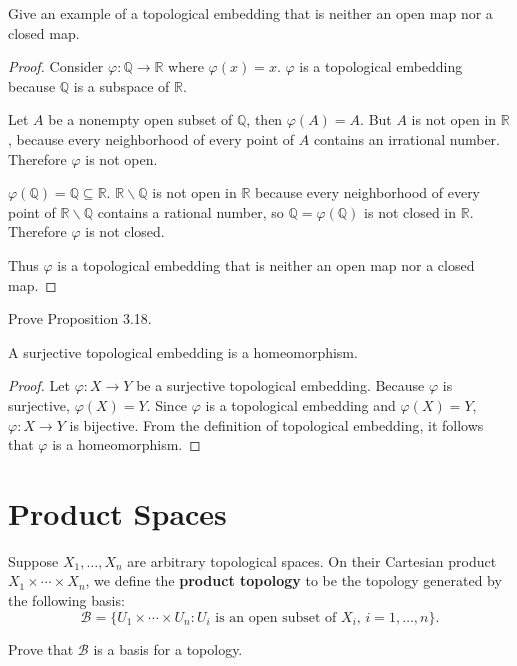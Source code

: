 \begin{exercise}{3.17}
    Give an example of a topological embedding that is neither an open map nor a closed map.
\end{exercise}

\begin{proof}
    Consider $\varphi: \mathbb{Q}\to \mathbb{R}$ where $\varphi(x) = x$. $\varphi$ is a topological embedding because $\mathbb{Q}$ is a subspace of $\mathbb{R}$.

    Let $A$ be a nonempty open subset of $\mathbb{Q}$, then $\varphi(A) = A$. But $A$ is not open in $\mathbb{R}$, because every neighborhood of every point of $A$ contains an irrational number. Therefore $\varphi$ is not open.

    $\varphi(\mathbb{Q}) = \mathbb{Q} \subseteq \mathbb{R}$. $\mathbb{R}\smallsetminus \mathbb{Q}$ is not open in $\mathbb{R}$ because every neighborhood of every point of $\mathbb{R}\smallsetminus \mathbb{Q}$ contains a rational number, so $\mathbb{Q} = \varphi(\mathbb{Q})$ is not closed in $\mathbb{R}$. Therefore $\varphi$ is not closed.

    Thus $\varphi$ is a topological embedding that is neither an open map nor a closed map.
\end{proof}

\begin{exercise}{3.19}
    Prove Proposition 3.18.

    A surjective topological embedding is a homeomorphism.
\end{exercise}

\begin{proof}
    Let $\varphi: X\to Y$ be a surjective topological embedding. Because $\varphi$ is surjective, $\varphi(X) = Y$. Since $\varphi$ is a topological embedding and $\varphi(X) = Y$, $\varphi: X\to Y$ is bijective. From the definition of topological embedding, it follows that $\varphi$ is a homeomorphism.
\end{proof}

\section*{Product Spaces}

\begin{exercise}{3.25}
    Suppose $X_{1}, \ldots, X_{n}$ are arbitrary topological spaces. On their Cartesian product $X_{1}\times \cdots \times X_{n}$, we define the \textbf{product topology} to be the topology generated by the following basis:
    \[
        \mathscr{B} = \{ U_{1} \times \cdots \times U_{n}: \text{$U_{i}$ is an open subset of $X_{i}$, $i = 1,\ldots,n $}  \}.
    \]

    Prove that $\mathscr{B}$ is a basis for a topology.
\end{exercise}

